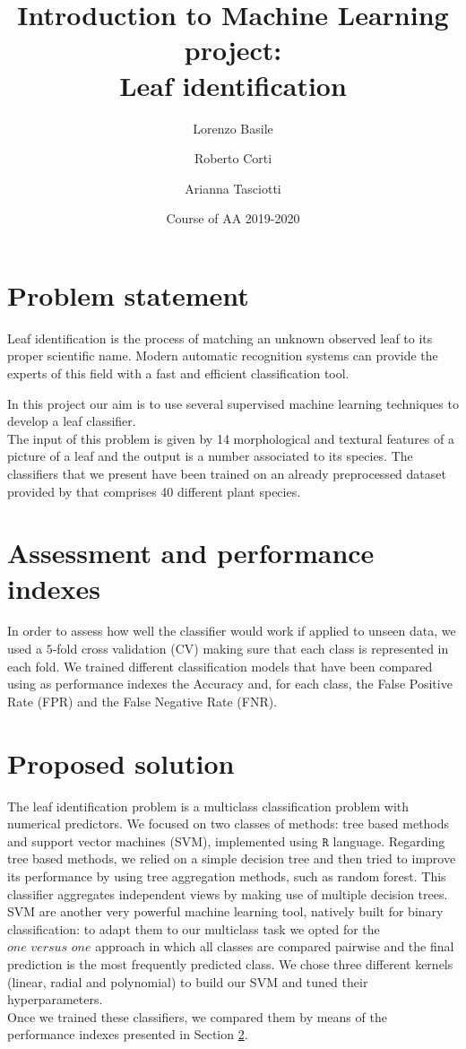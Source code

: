 \documentclass{article}
\title{Introduction to Machine Learning project:\\ Leaf identification}
\author[1]{Lorenzo Basile}
\author[2]{Roberto Corti}
\author[3]{Arianna Tasciotti}
\affil[1,2,3]{
    problem statement,
    solution design,
    solution development,
    writing
}
\date{Course of AA 2019-2020}
\begin{document}
\maketitle



\section{Problem statement}
Leaf identification is the process of matching an unknown observed leaf to its proper scientific name. Modern automatic recognition systems can provide the experts of this field with a fast and efficient classification tool. 

In this project our aim is to use several supervised machine learning techniques to develop a leaf classifier. \\
The input of this problem is given by 14 morphological and textural features of a picture of a leaf and the output is a number associated to its species. The classifiers that we present have been trained on an already preprocessed dataset provided by \cite{silva} that comprises 40 different plant species.

\section{Assessment and performance indexes}\label{2}
In order to assess how well the classifier would work if applied to unseen data, we used a $5$-fold cross validation (CV) making sure that each class is represented in each fold. We trained different classification models that have been compared using as performance indexes the Accuracy and, for each class, the False Positive Rate (FPR) and the False Negative Rate (FNR).

\section{Proposed solution}\label{3}
The leaf identification problem is a multiclass classification problem with numerical predictors. We focused on two classes of methods: tree based methods and support vector machines (SVM), implemented using $\texttt{R}$ language.
Regarding tree based methods, we relied on a simple decision tree and then tried to improve its performance by using tree aggregation methods, such as random forest. This classifier aggregates independent views by making use of multiple decision trees. 
\\SVM are another very powerful machine learning tool, natively built for binary classification: to adapt them to our multiclass task we opted for the $\textit{one versus one}$ approach in which all classes are compared pairwise and the final prediction is the most frequently predicted class. We chose three different kernels (linear, radial and polynomial) to build our SVM and tuned their hyperparameters.
\\Once we trained these classifiers, we compared them by means of the performance indexes presented in Section \ref{2}.
\end{document}
